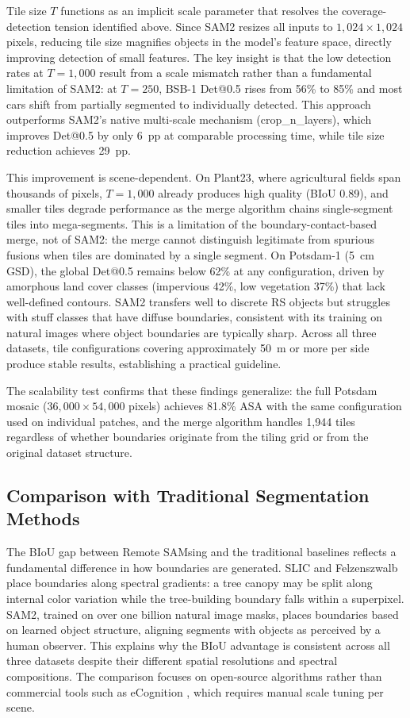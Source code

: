 \documentclass[review,11pt,authoryear]{elsarticle}
\begin{document}
Tile size $T$ functions as an implicit scale parameter that resolves the coverage-detection tension identified above. Since SAM2 resizes all inputs to $1{,}024 \times 1{,}024$ pixels, reducing tile size magnifies objects in the model's feature space, directly improving detection of small features. The key insight is that the low detection rates at $T = 1{,}000$ result from a scale mismatch rather than a fundamental limitation of SAM2: at $T = 250$, BSB-1 Det@0.5 rises from 56\% to 85\% and most cars shift from partially segmented to individually detected. This approach outperforms SAM2's native multi-scale mechanism (crop\_n\_layers), which improves Det@0.5 by only 6~pp at comparable processing time, while tile size reduction achieves 29~pp.

This improvement is scene-dependent. On Plant23, where agricultural fields span thousands of pixels, $T = 1{,}000$ already produces high quality (BIoU 0.89), and smaller tiles degrade performance as the merge algorithm chains single-segment tiles into mega-segments. This is a limitation of the boundary-contact-based merge, not of SAM2: the merge cannot distinguish legitimate from spurious fusions when tiles are dominated by a single segment. On Potsdam-1 (5~cm GSD), the global Det@0.5 remains below 62\% at any configuration, driven by amorphous land cover classes (impervious 42\%, low vegetation 37\%) that lack well-defined contours. SAM2 transfers well to discrete RS objects but struggles with stuff classes that have diffuse boundaries, consistent with its training on natural images where object boundaries are typically sharp. Across all three datasets, tile configurations covering approximately 50~m or more per side produce stable results, establishing a practical guideline.

The scalability test confirms that these findings generalize: the full Potsdam mosaic ($36{,}000 \times 54{,}000$ pixels) achieves 81.8\% ASA with the same configuration used on individual patches, and the merge algorithm handles 1{,}944 tiles regardless of whether boundaries originate from the tiling grid or from the original dataset structure.

\subsection{Comparison with Traditional Segmentation Methods}
\label{sec:disc_baselines}

The BIoU gap between Remote SAMsing and the traditional baselines reflects a fundamental difference in how boundaries are generated. SLIC and Felzenszwalb place boundaries along spectral gradients: a tree canopy may be split along internal color variation while the tree-building boundary falls within a superpixel. SAM2, trained on over one billion natural image masks, places boundaries based on learned object structure, aligning segments with objects as perceived by a human observer. This explains why the BIoU advantage is consistent across all three datasets despite their different spatial resolutions and spectral compositions. The comparison focuses on open-source algorithms rather than commercial tools such as eCognition \citep{baatz2000multiresolution}, which requires manual scale tuning per scene.
\end{document}
